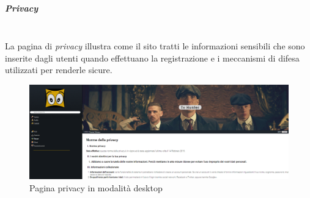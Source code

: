 \subparagraph{Privacy}
~\\
La pagina di \textit{privacy} illustra come il sito tratti le informazioni sensibili che sono inserite dagli utenti quando effettuano la registrazione e i meccanismi di difesa utilizzati per renderle sicure.
\begin{figure}[H]
	\centerline{\includegraphics[scale= 0.25]{img/privacy.png}}
	\caption{Pagina privacy in modalità desktop}
	
\end{figure}

